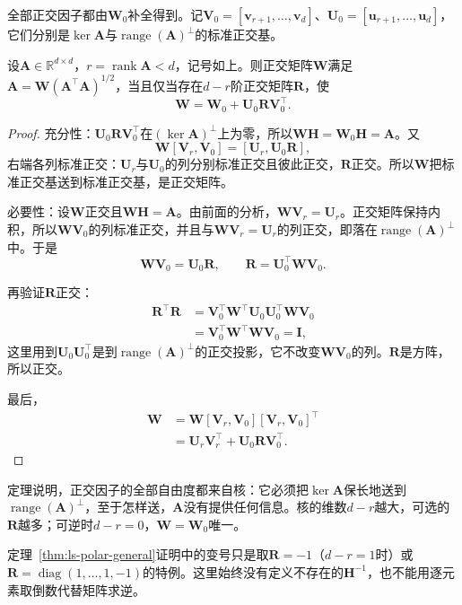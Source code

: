 全部正交因子都由$\bm W_0$补全得到。记$\bm V_0=[\bm v_{r+1},\ldots,\bm v_d]$、$\bm U_0=[\bm u_{r+1},\ldots,\bm u_d]$，它们分别是$\ker\bm A$与$\operatorname{range}(\bm A)^\perp$的标准正交基。

\begin{theorem}[奇异方阵的全部正交因子]
\label{thm:polar-singular-orthogonal-factors}
设$\bm A\in\mathbb R^{d\times d}$，$r=\operatorname{rank}\bm A<d$，记号如上。则正交矩阵$\bm W$满足$\bm A=\bm W(\bm A^\top\bm A)^{1/2}$，当且仅当存在$d-r$阶正交矩阵$\bm R$，使
\begin{equation}
 \bm W=\bm W_0+\bm U_0\bm R\bm V_0^\top .
 \label{eq:ls-polar-all-orthogonal-factors}
\end{equation}
\end{theorem}
\begin{proof}
充分性：$\bm U_0\bm R\bm V_0^\top$在$(\ker\bm A)^\perp$上为零，所以$\bm W\bm H=\bm W_0\bm H=\bm A$。又
\[
 \bm W[\bm V_r,\bm V_0]=[\bm U_r,\bm U_0\bm R],
\]
右端各列标准正交：$\bm U_r$与$\bm U_0$的列分别标准正交且彼此正交，$\bm R$正交。所以$\bm W$把标准正交基送到标准正交基，是正交矩阵。

必要性：设$\bm W$正交且$\bm W\bm H=\bm A$。由前面的分析，$\bm W\bm V_r=\bm U_r$。正交矩阵保持内积，所以$\bm W\bm V_0$的列标准正交，并且与$\bm W\bm V_r=\bm U_r$的列正交，即落在$\operatorname{range}(\bm A)^\perp$中。于是
\[
 \bm W\bm V_0=\bm U_0\bm R,\qquad\bm R=\bm U_0^\top\bm W\bm V_0 .
\]

再验证$\bm R$正交：
\[
 \begin{aligned}
 \bm R^\top\bm R&=\bm V_0^\top\bm W^\top\bm U_0\bm U_0^\top\bm W\bm V_0\\
 &=\bm V_0^\top\bm W^\top\bm W\bm V_0=\bm I ,
 \end{aligned}
\]
这里用到$\bm U_0\bm U_0^\top$是到$\operatorname{range}(\bm A)^\perp$的正交投影，它不改变$\bm W\bm V_0$的列。$\bm R$是方阵，所以正交。

最后，
\[
 \begin{aligned}
 \bm W&=\bm W[\bm V_r,\bm V_0][\bm V_r,\bm V_0]^\top\\
 &=\bm U_r\bm V_r^\top+\bm U_0\bm R\bm V_0^\top .
 \end{aligned}
\]
\end{proof}

定理说明，正交因子的全部自由度都来自核：它必须把$\ker\bm A$保长地送到$\operatorname{range}(\bm A)^\perp$，至于怎样送，$\bm A$没有提供任何信息。核的维数$d-r$越大，可选的$\bm R$越多；可逆时$d-r=0$，$\bm W=\bm W_0$唯一。

定理~\ref{thm:ls-polar-general}证明中的变号只是取$\bm R=-1$（$d-r=1$时）或$\bm R=\operatorname{diag}(1,\ldots,1,-1)$的特例。这里始终没有定义不存在的$\bm H^{-1}$，也不能用逐元素取倒数代替矩阵求逆。

